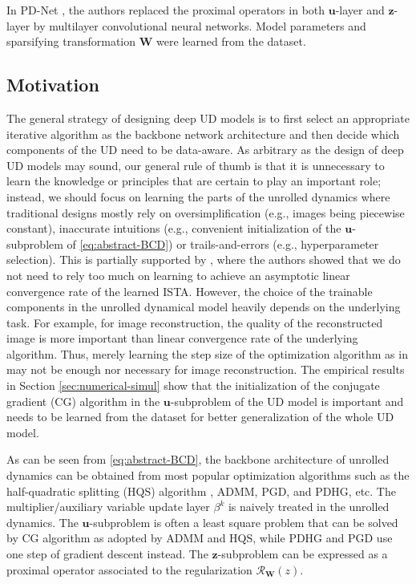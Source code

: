 \documentclass[journal,twoside]{IEEEtran}
\begin{document}
In PD-Net \cite{adler2018learned}, the authors replaced the proximal operators in both $\bm{u}$-layer and $\bm{z}$-layer by multilayer convolutional neural networks. Model parameters and sparsifying transformation $\bm{W}$ were learned from the dataset. 

\subsection{Motivation}
The general strategy of designing deep UD models is to first select an appropriate iterative algorithm as the backbone network architecture and then decide which components of the UD need to be data-aware. As arbitrary as the design of deep UD models may sound, our general rule of thumb is that it is unnecessary to learn the knowledge or principles that are certain to play an important role; instead, we should focus on learning the parts of the unrolled dynamics where traditional designs mostly rely on oversimplification (e.g., images being piecewise constant), inaccurate intuitions (e.g., convenient initialization of the $\bm{u}$-subproblem of \eqref{eq:abstract-BCD}) or trails-and-errors (e.g., hyperparameter selection). This is partially supported by \cite{liu2019alista,chen2018theoretical}, where the authors showed that we do not need to rely too much on learning to achieve an asymptotic linear convergence rate of the learned ISTA. However, the choice of the trainable components in the unrolled dynamical model heavily depends on the underlying task. For example, for image reconstruction, the quality of the reconstructed image is more important than linear convergence rate of the underlying algorithm. Thus, merely learning the step size of the optimization algorithm as in \cite{liu2019alista,chen2018theoretical} may not be enough nor necessary for image reconstruction. The empirical results in Section \ref{sec:numerical-simul} show that the initialization of the conjugate gradient (CG) algorithm in the $\bm{u}$-subproblem of the UD model is important and needs to be learned from the dataset for better generalization of the whole UD model.


As can be seen from \eqref{eq:abstract-BCD}, the backbone architecture of unrolled dynamics can be obtained from most popular optimization algorithms such as the half-quadratic splitting (HQS) algorithm \cite{geman1995HQS}, ADMM, PGD, and PDHG, etc. The multiplier/auxiliary variable update layer $\beta^{k}$ is naively treated in the unrolled dynamics. The $\bm{u}$-subproblem is often a least square problem that can be solved by CG algorithm as adopted by ADMM and HQS, while PDHG and PGD use one step of gradient descent instead. The $\bm{z}$-subproblem can be expressed as a proximal operator associated to the regularization $\mathcal{R}_{\bm{W}}(z)$.
\end{document}
